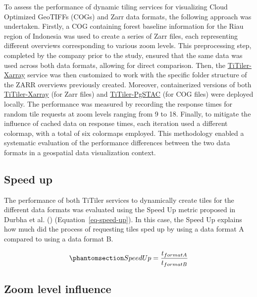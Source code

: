 \documentclass[
  oneside,
  open=any]{scrbook}
\begin{document}
To assess the performance of dynamic tiling services for visualizing
Cloud Optimized GeoTIFFs (COGs) and Zarr data formats, the following
approach was undertaken. Firstly, a COG containing forest baseline
information for the Riau region of Indonesia was used to create a series
of Zarr files, each representing different overviews corresponding to
various zoom levels. This preprocessing step, completed by the company
prior to the study, ensured that the same data was used across both data
formats, allowing for direct comparison. Then, the
\href{https://github.com/developmentseed/titiler-xarray}{TiTiler-Xarray}
service was then customized to work with the specific folder structure
of the ZARR overviews previously created. Moreover, containerized
versions of both
\href{https://github.com/developmentseed/titiler-xarray}{TiTiler-Xarray}
(for Zarr files) and
\href{https://github.com/stac-utils/titiler-pgstac}{TiTiler-PgSTAC} (for
COG files) were deployed locally. The performance was measured by
recording the response times for random tile requests at zoom levels
ranging from 9 to 18. Finally, to mitigate the influence of cached data
on response times, each iteration used a different colormap, with a
total of six colormaps employed. This methodology enabled a systematic
evaluation of the performance differences between the two data formats
in a geospatial data visualization context.

\subsection{Speed up}\label{speed-up}

The performance of both TiTiler services to dynamically create tiles for
the different data formats was evaluated using the Speed Up metric
proposed in Durbha et al. ()
(Equation~\ref{eq-speed-up}). In this case, the Speed Up explains how
much did the process of requesting tiles sped up by using a data format
A compared to using a data format B.

\begin{equation}\phantomsection\label{eq-speed-up}{ SpeedUp = \frac{t_{format A}}{t_{format B}} }\end{equation}

\subsection{Zoom level influence}\label{zoom-level-influence}
\end{document}
